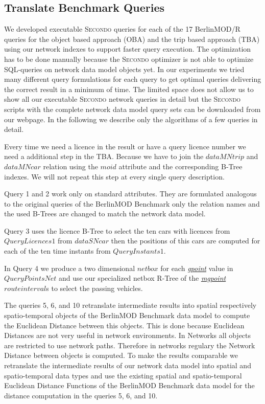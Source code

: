 \documentclass[a4paper]{article}
\newcommand{\secondo}{\textsc{Secondo}}
\newcommand{\bmodb} {BerlinMOD Benchmark}
\newcommand{\dt}[1]{\textsl{\underline{#1}}}
\begin{document}
\subsection{Translate Benchmark Queries}
\label{sec:queries}
We developed executable \secondo{} queries for each of the 17 BerlinMOD/R queries
for the object based approach (OBA) and the trip based approach (TBA) using our
network indexes to support faster query execution. The optimization has to be
done manually because the \secondo{} optimizer is not able to optimize SQL-queries
on network data model objects yet. In our experiments we tried many different query
formulations for each query to get optimal queries delivering the correct result
in a minimum of time. The limited space does not allow us to show all our
executable \secondo{} network queries in detail but the \secondo{} scripts with
the complete network data model query sets can be downloaded from our webpage.
In the following we describe only the algorithms of a few queries in detail.

Every time we need a licence in the result or have a query licence number we need
a additional step in the TBA. Because we have to join the $dataMNtrip$ and $dataMNcar$
relation using the $moid$ attribute and the corresponding B-Tree indexes.
We will not repeat this step at every single query description.

Query 1 and 2 work only on standard attributes. They are formulated analogous to
the original queries of the \bmodb{} only the relation names and the used B-Trees
are changed to match the network data model.

Query 3 uses the licence B-Tree to select the ten cars with licences from
$QueryLicences1$ from $dataSNcar$ then the positions of this cars are computed
for each of the ten time instants from $QueryInstants1$.

In Query 4 we produce a two dimensional $netbox$ for each \dt{gpoint} value in
$QueryPointsNet$ and use our specialized netbox R-Tree of the \dt{mgpoint}
$route interval$s to select the passing vehicles.

The queries 5, 6, and 10 retranslate intermediate results into spatial
respectively spatio-temporal objects of the \bmodb{} data model to compute the
Euclidean Distance between this objects. This is done because Euclidean Distances
are not very useful in network environments. In Networks all objects are restricted
to use network paths. Therefore in networks regulary the Network Distance between
objects is computed. To make the results comparable we retranslate the intermediate
results of our network data model into spatial and spatio-temporal data types
and use the existing spatial and spatio-temporal Euclidean Distance Functions of
the \bmodb{} data model for the distance computation in the queries 5, 6, and 10.
\end{document}

